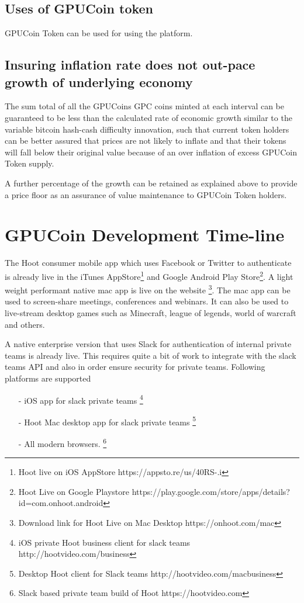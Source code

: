 \documentclass{article}
\begin{document}
\subsection{Uses of GPUCoin token} %
\label{sub:uses_of_hoot_token}
GPUCoin Token can be used for using the platform.

\subsection{Insuring inflation rate does not out-pace growth of underlying economy}
The sum total of all the GPUCoins GPC coins minted at each interval can be guaranteed to be less than the calculated rate of economic growth similar to the variable bitcoin hash-cash difficulty innovation, such that current token holders can be better assured that prices are not likely to inflate and that their tokens will fall below their original value because of an over inflation of excess GPUCoin Token supply.

A further percentage of the growth can be retained as explained above to provide a price floor as an assurance of value maintenance to GPUCoin Token holders. 

\section{GPUCoin Development Time-line}
The Hoot consumer mobile app which uses Facebook or Twitter to authenticate is already live in the iTunes AppStore\footnote{Hoot live on iOS AppStore https://appsto.re/us/40RS-.i} and Google Android Play Store\footnote{Hoot Live on Google Playstore https://play.google.com/store/apps/details?id=com.onhoot.android}.
A light weight performant native mac app is live on
the website \footnote{Download link for Hoot Live on Mac Desktop https://onhoot.com/mac}. The mac app can be used to screen-share meetings, conferences and webinars. It can also be used to live-stream desktop games such as Minecraft, league of legends, world of warcraft and others.

A native enterprise version that uses Slack for authentication of internal private teams is already live.
 This requires quite a bit of work to integrate with the slack teams API and also in order ensure security for private teams. Following platforms are supported
\begin{itemize}

\item[-]iOS app for slack private teams \footnote{ iOS private Hoot business client for slack teams http://hootvideo.com/business}
\item[-]Hoot Mac desktop app for slack private teams \footnote{Desktop Hoot client for Slack teams http://hootvideo.com/macbusiness}
\item[-]All modern browsers. \footnote{Slack based private team build of Hoot https://hootvideo.com}
\end{itemize}
\end{document}
